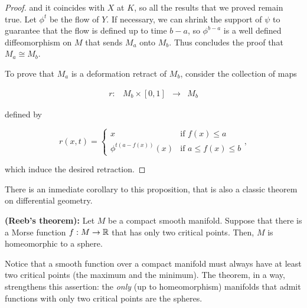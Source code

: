\begin{proof}
and it coincides with $X$ at $K$, so all the results that we proved remain true. Let $\phi^t$ be the flow of $Y$. If necessary, we can shrink the support of $\psi$ to guarantee that the flow is defined up to time $b-a$, so $\phi^{b-a}$ is a well defined diffeomorphism on $M$ that sends $M_a$ onto $M_b$. Thus concludes the proof that $M_a \cong M_b$.

To prove that $M_a$ is a deformation retract of $M_b$, consider the collection of maps

$$\begin{array}{rccc} r : & M_b \times [0,1] & \longrightarrow & M_b \end{array}$$

defined by

$$r(x,t) = \left\{ \begin{array}{ll} x & \text{if } f(x) \leq a \\ \phi^{t(a-f(x))}(x) & \text{if } a \leq f(x) \leq b \end{array} \right. ,$$

which induce the desired retraction.
\end{proof}

There is an inmediate corollary to this proposition, that is also a classic theorem on differential geometry.

\begin{coro} {\bf (Reeb's theorem):} Let $M$ be a compact smooth manifold. Suppose that there is a Morse function $f : M \rightarrow \mathbb{R}$ that has only two critical points. Then, $M$ is homeomorphic to a sphere.\end{coro}

\begin{rmrk} Notice that a smooth function over a compact manifold must always have at least two critical points (the maximum and the minimum). The theorem, in a way, strengthens this assertion: the {\it only} (up to homeomorphism) manifolds that admit functions with only two critical points are the spheres.
\end{rmrk}


